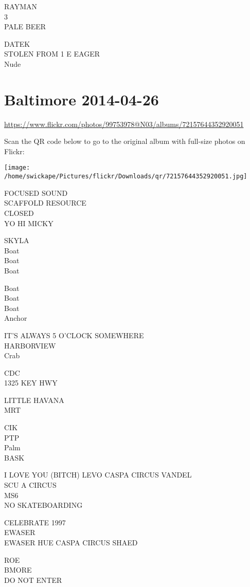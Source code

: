 \documentclass[10pt,letterpaper]{article}
\begin{document}
RAYMAN\\
3\\
PALE BEER

DATEK\\
STOLEN FROM 1 E EAGER\\
Nude


\section*{Baltimore 2014-04-26}

\url{https://www.flickr.com/photos/99753978@N03/albums/72157644352920051}

Scan the QR code below to go to the original album with full-size photos on Flickr:

\texttt{[image: /home/swickape/Pictures/flickr/Downloads/qr/72157644352920051.jpg]}


FOCUSED SOUND\\
SCAFFOLD RESOURCE\\
CLOSED\\
YO HI MICKY

SKYLA\\
Boat\\
Boat\\
Boat

Boat\\
Boat\\
Boat\\
Anchor

IT'S ALWAYS 5 O'CLOCK SOMEWHERE\\
HARBORVIEW\\
Crab

CDC\\
1325 KEY HWY

LITTLE HAVANA\\
MRT

CIK\\
PTP\\
Palm\\
BASK

I LOVE YOU (BITCH) LEVO CASPA CIRCUS VANDEL\\
SCU A CIRCUS\\
MS6\\
NO SKATEBOARDING

CELEBRATE 1997\\
EWASER\\
EWASER HUE CASPA CIRCUS SHAED

ROE\\
BMORE\\
DO NOT ENTER
\end{document}
